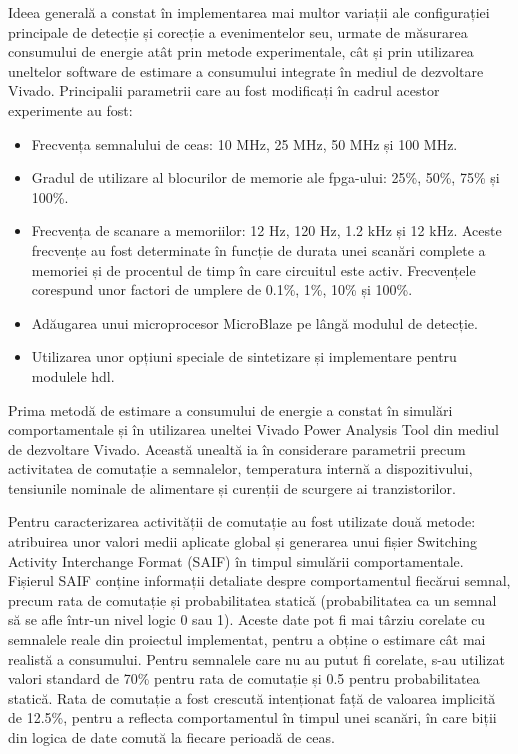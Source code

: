\documentclass[12pt,a4paper]{report}
\begin{document}
Ideea generală a constat în implementarea mai multor variații ale configurației principale de detecție și corecție a evenimentelor \gls{seu}, urmate de măsurarea consumului de energie atât prin metode experimentale, cât și prin utilizarea uneltelor software de estimare a consumului integrate în mediul de dezvoltare Vivado. Principalii parametrii care au fost modificați în cadrul acestor experimente au fost:
\begin{itemize}
    \item Frecvența semnalului de ceas: 10 MHz, 25 MHz, 50 MHz și 100 MHz.
    \item Gradul de utilizare al blocurilor de memorie ale \gls{fpga}-ului: 25\%, 50\%, 75\% și 100\%.
    \item Frecvența de scanare a memoriilor: 12 Hz, 120 Hz, 1.2 kHz și 12 kHz. Aceste frecvențe au fost determinate în funcție de durata unei scanări complete a memoriei și de procentul de timp în care circuitul este activ. Frecvențele corespund unor factori de umplere de 0.1\%, 1\%, 10\% și 100\%. 
    \item Adăugarea unui microprocesor MicroBlaze pe lângă modulul de detecție.
    \item Utilizarea unor opțiuni speciale de sintetizare și implementare pentru modulele \gls{hdl}.
\end{itemize}

Prima metodă de estimare a consumului de energie a constat în simulări comportamentale și în utilizarea uneltei Vivado Power Analysis Tool din mediul de dezvoltare Vivado. Această unealtă ia în considerare parametrii precum activitatea de comutație a semnalelor, temperatura internă a dispozitivului, tensiunile nominale de alimentare și curenții de scurgere ai tranzistorilor. 

Pentru caracterizarea activității de comutație au fost utilizate două metode: atribuirea unor valori medii aplicate global și generarea unui fișier Switching Activity Interchange Format (SAIF) în timpul simulării comportamentale. Fișierul SAIF conține informații detaliate despre comportamentul fiecărui semnal, precum rata de comutație și probabilitatea statică (probabilitatea ca un semnal să se afle într-un nivel logic 0 sau 1). Aceste date pot fi mai târziu corelate cu semnalele reale din proiectul implementat, pentru a obține o estimare cât mai realistă a consumului. Pentru semnalele care nu au putut fi corelate, s-au utilizat valori standard de 70\% pentru rata de comutație și 0.5 pentru probabilitatea statică. Rata de comutație a fost crescută intenționat față de valoarea implicită de 12.5\%, pentru a reflecta comportamentul în timpul unei scanări, în care biții din logica de date comută la fiecare perioadă de ceas. 
\end{document}
